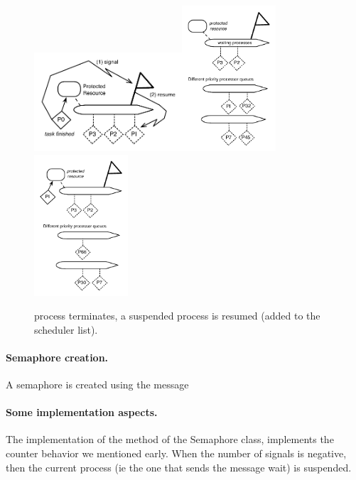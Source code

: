 \documentclass[a4paper,10pt,twoside]{book}
\begin{document}
\begin{figure}
\begin{center}
\includegraphics[width=5.5cm]{SemaphoreSendingSignal}\includegraphics[width=3.5cm]{ProcessToInSchedulerQueue}\includegraphics[width=3.5cm]{SemaphoreResuming}
\caption{  process terminates, a suspended process is resumed (added to the scheduler list).}
\end{center}
\end{figure}




\paragraph{Semaphore creation.}
A semaphore is created using the message 




\paragraph{Some implementation aspects.} The implementation of the method  of the Semaphore class,
implements the counter behavior we mentioned early. When the number of signals is negative, then the current process (ie the one that sends the message wait) is suspended. 
\end{document}
